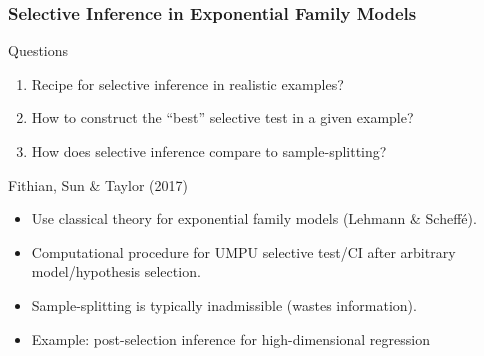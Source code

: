 \begin{frame}
  \frametitle{Selective Inference in Exponential Family Models}

  \footnotesize
  
  \begin{block}{Questions}
  \begin{enumerate}
    \item Recipe for selective inference in realistic examples?
    \item How to construct the ``best'' selective test in a given example?
    \item How does selective inference compare to sample-splitting?
  \end{enumerate}
\end{block}
 
\begin{block}{Fithian, Sun \& Taylor (2017)}
  \begin{itemize}
    \item Use classical theory for exponential family models (Lehmann \& Scheff\'e).
    \item Computational procedure for UMPU selective test/CI after arbitrary model/hypothesis selection.
    \item Sample-splitting is typically inadmissible (wastes information).
    \item Example: post-selection inference for high-dimensional regression
  \end{itemize}
\end{block}

\end{frame}
